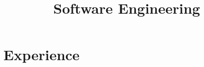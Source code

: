 \documentclass[10pt,a4paper,sans]{moderncv} %
\title{Software Engineering}
\begin{document}
\makecvtitle %



\section{Experience}


\end{document}
